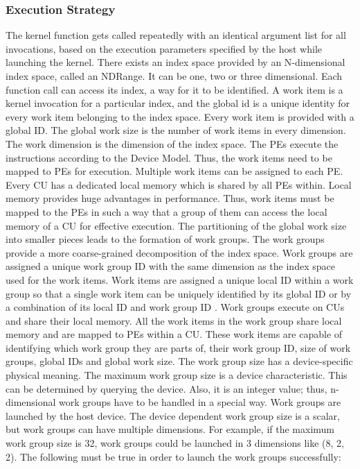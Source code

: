 \subsubsection{Execution Strategy}
\label{sect4_1_3_1}
The kernel function gets called repeatedly with an identical argument list for all invocations, based on the execution parameters specified by the host while launching the kernel.\newline\newline
There exists an index space provided by an N-dimensional index space, called an NDRange. It can be one, two or three dimensional. Each function call can access its index, a way for it to be identified. A work item is a kernel invocation for a particular index, and the global id is a unique identity for every work item belonging to the index space. Every work item is provided with a global ID. The global work size is the number of work items in every dimension. The work dimension is the dimension of the index space.\newline\newline 
The \ac{PE}s execute the instructions according to the Device Model. Thus, the work items need to be mapped to PEs for execution. Multiple work items can be assigned to each PE.\newline\newline
Every \ac{CU} has a dedicated local memory which is shared by all PEs within. Local memory provides huge advantages in performance. Thus, work items must be mapped to the PEs in such a way that a group of them can access the local memory of a CU for effective execution. The partitioning of the global work size into smaller pieces leads to the formation of work groups. The work groups provide a more coarse-grained decomposition of the index space. Work groups are assigned a unique work group ID with the same dimension as the index space used for the work items. Work items are assigned a unique local ID within a work group so that a single work item can be uniquely identified by its global ID or by a combination of its local ID and work group ID \cite{opencl_khronos}. \newline\newline
Work groups execute on CUs and share their local memory. All the work items in the work group share local memory and are mapped to PEs within a CU. These work items are capable of identifying which work group they are parts of, their work group ID, size of work groups, global IDs and global work size. \newline\newline 
The work group size has a device-specific physical meaning. The maximum work group size is a device characteristic. This can be determined by querying the device. Also, it is an integer value; thus, n-dimensional work groups have to be handled in a special way. Work groups are launched by the host device. \newline\newline
The device dependent work group size is a scalar, but work groups can have multiple dimensions. For example, if the maximum work group size is 32, work groups could be launched in 3 dimensions like (8, 2, 2). The following must be true in order to launch the work groups successfully: 

